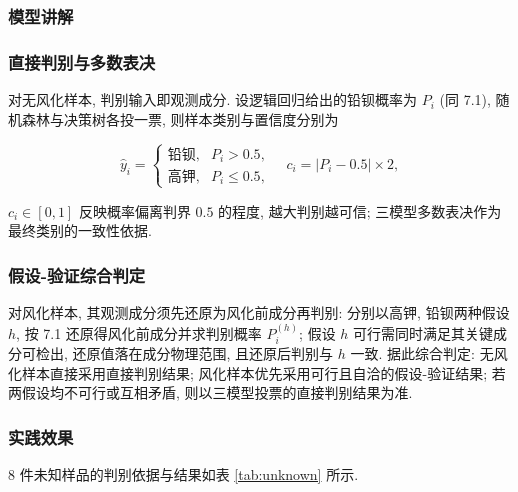 \documentclass{ctexart}
\begin{document}
\subsubsection{模型讲解}

\subsubsection{直接判别与多数表决}

对无风化样本, 判别输入即观测成分. 设逻辑回归给出的铅钡概率为 $P_i$ (同 7.1), 随机森林与决策树各投一票, 则样本类别与置信度分别为

\begin{equation*}
\widehat{y}_i=\begin{cases}\text{铅钡},&P_i>0.5,\\\text{高钾},&P_i\le0.5,\end{cases}\quad{}c_i=\left|P_i-0.5\right|\times2,
\end{equation*}

$c_i\in\left[0,1\right]$ 反映概率偏离判界 $0.5$ 的程度, 越大判别越可信; 三模型多数表决作为最终类别的一致性依据.


\subsubsection{假设-验证综合判定}

对风化样本, 其观测成分须先还原为风化前成分再判别: 分别以高钾, 铅钡两种假设 $h$, 按 7.1 还原得风化前成分并求判别概率 $P_i^{\left(h\right)}$; 假设 $h$ 可行需同时满足其关键成分可检出, 还原值落在成分物理范围, 且还原后判别与 $h$ 一致. 据此综合判定: 无风化样本直接采用直接判别结果; 风化样本优先采用可行且自洽的假设-验证结果; 若两假设均不可行或互相矛盾, 则以三模型投票的直接判别结果为准.


\subsubsection{实践效果}

$8$ 件未知样品的判别依据与结果如表 \ref{tab:unknown} 所示.
\end{document}
